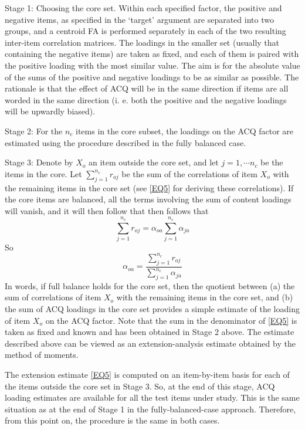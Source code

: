 Stage 1: Choosing the core set. Within each specified factor, the positive and negative items, as specified in the ‘target’ argument are separated into two groups, and a centroid FA is performed separately in each of the two resulting inter-item correlation matrices. The loadings in the smaller set (usually that containing the negative items) are taken as fixed, and each of them is paired with the positive loading with the most similar value. The aim is for the absolute value of the sums of the positive and negative loadings to be as similar as possible. The rationale is that the effect of ACQ will be in the same direction if items are all worded in the same direction (i. e. both the positive and the negative loadings will be upwardly biased).

Stage 2: For the $n_c$ items in the core subset, the loadings on the ACQ factor are estimated using the procedure described in the fully balanced case.

Stage 3: Denote by $X_o$ an item outside the core set, and let $j=1,\cdots n_c$  be the items in the core. Let $\sum_{j=1}^{n_c}r_{oj}$ be the sum of the correlations of item $X_o$ with the remaining items in the core set (see \eqref{EQ5} for deriving these correlations). If the core items are balanced, all the terms involving the sum of content loadings will vanish, and it will then follow that  then follows that
\begin{equation}
  \label{EQ4}
  \sum_{j=1}^{n_c}r_{oj}=\alpha_{oa}\sum_{j=1}^{n_c}\alpha_{ja}
\end{equation}
So
\begin{equation}
  \label{EQ5}
  \alpha_{oa}=\frac{\sum_{j=1}^{n_c}r_{oj}}{\sum_{j=1}^{n_c}\alpha_{ja}}
\end{equation}
In words, if full balance holds for the core set, then the quotient between (a) the sum of correlations of item $X_o$ with the remaining items in the core set, and (b) the sum of ACQ loadings in the core set provides a simple estimate of the loading of item $X_o$ on the ACQ factor. Note that the sum in the denominator of \eqref{EQ5} is taken as fixed and known and has been obtained in Stage 2 above. The estimate described above can be viewed as an extension-analysis estimate \citep[e.g.][]{McDonald:1978} obtained by the method of moments.

The extension estimate \eqref{EQ5} is computed on an item-by-item basis for each of the items outside the core set in Stage 3. So, at the end of this stage, ACQ loading estimates are available for all the test items under study. This is the same situation as at the end of Stage 1 in the fully-balanced-case approach. Therefore, from this point on, the procedure is the same in both cases.

